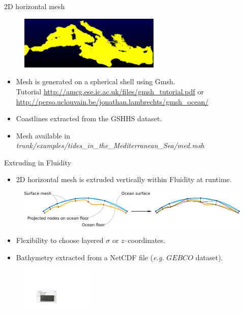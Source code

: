 \begin{frame}{2D horizontal mesh}

\begin{figure}[htbp!]
 \centering
  \includegraphics[width=0.6\textwidth]{./tides_in_the_Mediterranean_Sea/figures/med_mesh2}
\end{figure}
\begin{itemize}
\item Mesh is generated on a spherical shell using Gmsh.
\\ Tutorial {\footnotesize \url{http://amcg.ese.ic.ac.uk/files/gmsh\_tutorial.pdf}} or \\ {\footnotesize \url{http://perso.uclouvain.be/jonathan.lambrechts/gmsh_ocean/}}
\item Coastlines extracted from the GSHHS dataset.
\item Mesh available in {\it trunk/examples/tides\_in\_the\_Mediterranean\_Sea/med.msh}
\end{itemize}

\end{frame}

\begin{frame}{Extruding in Fluidity}
\begin{itemize}
\item 2D horizontal mesh is extruded vertically within Fluidity at runtime.
\end{itemize}
\begin{figure}[htbp!]
 \centering
  \includegraphics[width=1.0\textwidth]{./tides_in_the_Mediterranean_Sea/figures/mesh_extrusion.png}
\end{figure}
\begin{itemize}
\item Flexibility to choose layered $\sigma$ or $z$--coordinates.
\item Bathymetry extracted from a NetCDF file ({\it e.g.} $GEBCO$ dataset).
\end{itemize}

\begin{figure}[htbp!]
 \centering
  \includegraphics[width=0.3\textwidth]{./tides_in_the_Mediterranean_Sea/figures/extrude}
\end{figure}

\end{frame}

